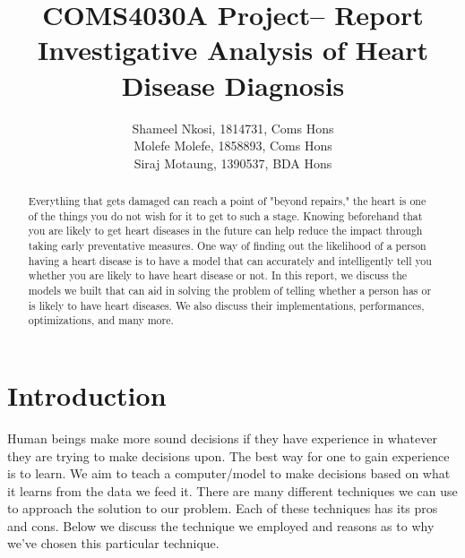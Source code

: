 
\title{
    COMS4030A Project-- Report \\
    Investigative Analysis of Heart Disease Diagnosis
    }
\author{
    Shameel Nkosi, 1814731, Coms Hons \\
    Molefe Molefe, 1858893, Coms Hons \\
    Siraj Motaung, 1390537, BDA Hons\\
    }

\maketitle 
\pagestyle{fancy}
\fancyhf{}
\fancyhead[R]{\thepage}
{} 

\newpage
\tableofcontents

\newpage
\listoffigures

\newpage
\vspace*{\fill}
\begin{abstract}
    \begin{center}
        Everything that gets damaged can reach a point of "beyond repairs," the heart is one of the things you do not wish for it to get to such a stage. Knowing beforehand that you are likely to get heart diseases in the future can help reduce the impact through taking early preventative measures. One way of finding out the likelihood of a person having a heart disease is to have a model that can accurately and intelligently tell you whether you are likely to have heart disease or not. In this report, we discuss the models we built that can aid in solving the problem of telling whether a person has or is likely to have heart diseases. We also discuss their implementations, performances, optimizations, and many more. 
    \end{center}
\end{abstract}
\vspace*{\fill}
\newpage
{}

\section{Introduction}
Human beings make more sound decisions if they have experience in whatever they are trying to make decisions upon. The best way for one to gain experience is to learn. We aim to teach a computer/model to make decisions based on what it learns from the data we feed it. There are many different techniques we can use to approach the solution to our problem. Each of these techniques has its pros and cons. Below we discuss the technique we employed and reasons as to why we've chosen this particular technique.

